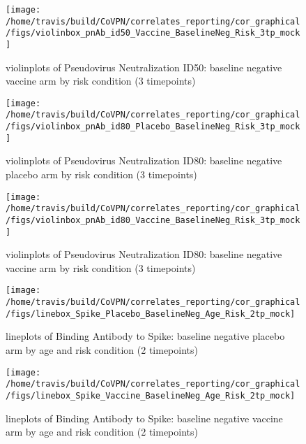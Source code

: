 \documentclass[]{book}
\theoremstyle{definition}
\theoremstyle{definition}
\theoremstyle{definition}
\newcommand{\1}{\mathbbm{1}}
\begin{document}
\clearpage
\begin{figure}[H]

{\centering \texttt{[image: /home/travis/build/CoVPN/correlates\_reporting/cor\_graphical/figs/violinbox\_pnAb\_id50\_Vaccine\_BaselineNeg\_Risk\_3tp\_mock]} 

}

\caption{violinplots of Pseudovirus Neutralization ID50: baseline negative vaccine arm by risk condition (3 timepoints)}\label{fig:unnamed-chunk-120}
\end{figure}

\clearpage
\begin{figure}[H]

{\centering \texttt{[image: /home/travis/build/CoVPN/correlates\_reporting/cor\_graphical/figs/violinbox\_pnAb\_id80\_Placebo\_BaselineNeg\_Risk\_3tp\_mock]} 

}

\caption{violinplots of Pseudovirus Neutralization ID80: baseline negative placebo arm by risk condition (3 timepoints)}\label{fig:unnamed-chunk-121}
\end{figure}

\clearpage
\begin{figure}[H]

{\centering \texttt{[image: /home/travis/build/CoVPN/correlates\_reporting/cor\_graphical/figs/violinbox\_pnAb\_id80\_Vaccine\_BaselineNeg\_Risk\_3tp\_mock]} 

}

\caption{violinplots of Pseudovirus Neutralization ID80: baseline negative vaccine arm by risk condition (3 timepoints)}\label{fig:unnamed-chunk-122}
\end{figure}

\clearpage
\begin{figure}[H]

{\centering \texttt{[image: /home/travis/build/CoVPN/correlates\_reporting/cor\_graphical/figs/linebox\_Spike\_Placebo\_BaselineNeg\_Age\_Risk\_2tp\_mock]} 

}

\caption{lineplots of Binding Antibody to Spike: baseline negative placebo arm by age and risk condition (2 timepoints)}\label{fig:unnamed-chunk-123}
\end{figure}

\clearpage
\begin{figure}[H]

{\centering \texttt{[image: /home/travis/build/CoVPN/correlates\_reporting/cor\_graphical/figs/linebox\_Spike\_Vaccine\_BaselineNeg\_Age\_Risk\_2tp\_mock]} 

}

\caption{lineplots of Binding Antibody to Spike: baseline negative vaccine arm by age and risk condition (2 timepoints)}\label{fig:unnamed-chunk-124}
\end{figure}
\end{document}
